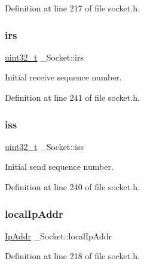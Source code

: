 Definition at line 217 of file socket.\+h.

\mbox{\label{struct__Socket_ab21f9ea02604b1eeb6414658b62af555}} 
\subsubsection{\texorpdfstring{irs}{irs}}
{\footnotesize\ttfamily \hyperlink{stdint_8h_a435d1572bf3f880d55459d9805097f62}{uint32\+\_\+t} \+\_\+\+Socket\+::irs}



Initial receive sequence number. 



Definition at line 241 of file socket.\+h.

\mbox{\label{struct__Socket_a4c01a6f4ddbdd45b9d1201c3e2c8f405}} 
\subsubsection{\texorpdfstring{iss}{iss}}
{\footnotesize\ttfamily \hyperlink{stdint_8h_a435d1572bf3f880d55459d9805097f62}{uint32\+\_\+t} \+\_\+\+Socket\+::iss}



Initial send sequence number. 



Definition at line 240 of file socket.\+h.

\mbox{\label{struct__Socket_a122697462b5d73ebd303f4f0a2b3db01}} 
\subsubsection{\texorpdfstring{local\+Ip\+Addr}{localIpAddr}}
{\footnotesize\ttfamily \hyperlink{structIpAddr}{Ip\+Addr} \+\_\+\+Socket\+::local\+Ip\+Addr}



Definition at line 218 of file socket.\+h.

\mbox{\label{struct__Socket_a24701cbaad250f6d0fd130987af9290e}} 
